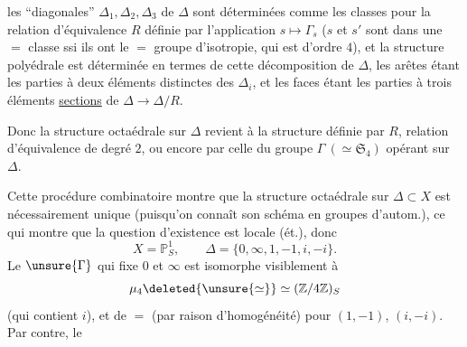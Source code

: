 les ``diagonales'' $\Delta_1,\Delta_2,\Delta_3$ de $\Delta$ sont déterminées   comme les classes pour la relation d'équivalence $R$ définie par l'application $s\longmapsto\Gamma_s$ ($s$ et $s'$ sont dans une $=$ classe ssi ils ont le $=$ groupe d'isotropie, qui est  d'ordre $4$), et la structure polyédrale est déterminée en termes de cette décomposition de $\Delta$, les arêtes étant les  parties à deux éléments distinctes des $\Delta_i$, et les  faces étant les parties à trois éléments \uline{sections} de $\Delta\longrightarrow\Delta/R$.

Donc la structure octaédrale sur $\Delta$ revient à la structure définie par $R$, relation d'équivalence de degré $2$, ou encore par celle du groupe $\Gamma\ (\simeq\mathfrak S_4)$ opérant sur $\Delta$.

Cette procédure combinatoire montre que la structure octaédrale  sur $\Delta\subset X$ est nécessairement unique (puisqu'on connaît son schéma en groupes d'autom.), ce qui montre que la question d'existence est locale (ét.), donc 
\[
X=\mathbb P^1_S,\qquad\Delta=\{0,\infty,1,-1,i,-i\}.
\]
Le   $\unsure{\Gamma}$ qui fixe $0$ et $\infty$ est isomorphe visiblement à
\[
\mu_4\deleted{\unsure{\simeq}}\simeq(\mathbb Z/4\mathbb Z)_S
\]
(qui contient $i$),  et de $=$ (par raison d'homogénéité) pour $(1,-1)$, $(i,-i)$. Par contre, le
